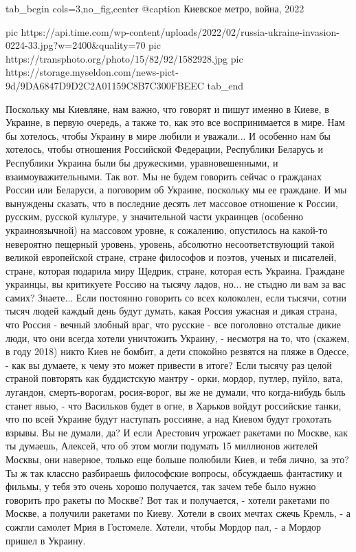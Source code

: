 \ifcmt
  tab_begin cols=3,no_fig,center
		 @caption Киевское метро, война, 2022

		 pic https://api.time.com/wp-content/uploads/2022/02/russia-ukraine-invasion-0224-33.jpg?w=2400&quality=70
		 pic https://transphoto.org/photo/15/82/92/1582928.jpg
		 pic https://storage.myseldon.com/news-pict-9d/9DA6847D9D2C2A01159C8B7C300FBEEC
  tab_end
\fi

Поскольку мы Киевляне, нам важно, что говорят и пишут именно в Киеве, в
Украине, в первую очередь, а также то, как это все воспринимается в мире. Нам
бы хотелось, чтобы Украину в мире любили и уважали... И особенно нам бы
хотелось, чтобы отношения Российской Федерации, Республики Беларусь и
Республики Украина были бы дружескими, уравновешенными, и взаимоуважительными.
Так вот. Мы не будем говорить сейчас о гражданах России или Беларуси, а
поговорим об Украине, поскольку мы ее граждане. И мы вынуждены сказать, что в
последние десять лет массовое отношение к России, русским, русской культуре, у
значительной части украинцев (особенно украиноязычной) на массовом уровне, к
сожалению, опустилось на какой-то невероятно пещерный уровень, уровень,
абсолютно несоответствующий такой великой европейской стране, стране философов
и поэтов, ученых и писателей, стране, которая подарила миру Щедрик, стране,
которая есть Украина. Граждане украинцы, вы критикуете Россию на тысячу ладов,
но... не стыдно ли вам за вас самих?  Знаете...  Если постоянно говорить со
всех колоколен, если тысячи, сотни тысяч людей каждый день будут думать, какая
Россия ужасная и дикая страна, что Россия - вечный злобный враг, что русские -
все поголовно отсталые дикие люди, что они всегда хотели уничтожить Украину, -
несмотря на то, что (скажем, в году 2018) никто Киев не бомбит, а дети спокойно
резвятся на пляже в Одессе, - как вы думаете, к чему это может привести в
итоге? Если тысячу раз целой страной повторять как буддистскую мантру - орки,
мордор, путлер, пуйло, вата, лугандон, смерть-ворогам, росия-ворог, вы же не
думали, что когда-нибудь быль станет явью, - что Васильков будет в огне, в
Харьков войдут российские танки, что по всей Украине будут наступать россияне,
а над Киевом будут грохотать взрывы. Вы не думали, да? И если Арестович
угрожает ракетами по Москве, как ты думаешь, Алексей, что об этом могли
подумать 15 миллионов жителей Москвы, они наверное, только еще больше полюбили
Киев, и тебя лично, за это? Ты ж так классно разбираешь философские вопросы,
обсуждаешь фантастику и фильмы, у тебя это очень хорошо получается, так зачем
тебе было нужно говорить про ракеты по Москве? Вот так и получается, - хотели
ракетами по Москве, а получили ракетами по Киеву. Хотели в своих мечтах сжечь
Кремль, - а сожгли самолет Мрия в Гостомеле.  Хотели, чтобы Мордор пал, - а
Мордор пришел в
Украину.

